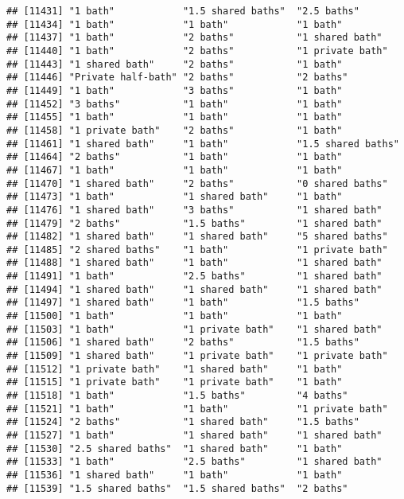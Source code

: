\documentclass[
]{article}
\begin{document}
\begin{verbatim}
## [11431] "1 bath"            "1.5 shared baths"  "2.5 baths"        
## [11434] "1 bath"            "1 bath"            "1 bath"           
## [11437] "1 bath"            "2 baths"           "1 shared bath"    
## [11440] "1 bath"            "2 baths"           "1 private bath"   
## [11443] "1 shared bath"     "2 baths"           "1 bath"           
## [11446] "Private half-bath" "2 baths"           "2 baths"          
## [11449] "1 bath"            "3 baths"           "1 bath"           
## [11452] "3 baths"           "1 bath"            "1 bath"           
## [11455] "1 bath"            "1 bath"            "1 bath"           
## [11458] "1 private bath"    "2 baths"           "1 bath"           
## [11461] "1 shared bath"     "1 bath"            "1.5 shared baths" 
## [11464] "2 baths"           "1 bath"            "1 bath"           
## [11467] "1 bath"            "1 bath"            "1 bath"           
## [11470] "1 shared bath"     "2 baths"           "0 shared baths"   
## [11473] "1 bath"            "1 shared bath"     "1 bath"           
## [11476] "1 shared bath"     "3 baths"           "1 shared bath"    
## [11479] "2 baths"           "1.5 baths"         "1 shared bath"    
## [11482] "1 shared bath"     "1 shared bath"     "5 shared baths"   
## [11485] "2 shared baths"    "1 bath"            "1 private bath"   
## [11488] "1 shared bath"     "1 bath"            "1 shared bath"    
## [11491] "1 bath"            "2.5 baths"         "1 shared bath"    
## [11494] "1 shared bath"     "1 shared bath"     "1 shared bath"    
## [11497] "1 shared bath"     "1 bath"            "1.5 baths"        
## [11500] "1 bath"            "1 bath"            "1 bath"           
## [11503] "1 bath"            "1 private bath"    "1 shared bath"    
## [11506] "1 shared bath"     "2 baths"           "1.5 baths"        
## [11509] "1 shared bath"     "1 private bath"    "1 private bath"   
## [11512] "1 private bath"    "1 shared bath"     "1 bath"           
## [11515] "1 private bath"    "1 private bath"    "1 bath"           
## [11518] "1 bath"            "1.5 baths"         "4 baths"          
## [11521] "1 bath"            "1 bath"            "1 private bath"   
## [11524] "2 baths"           "1 shared bath"     "1.5 baths"        
## [11527] "1 bath"            "1 shared bath"     "1 shared bath"    
## [11530] "2.5 shared baths"  "1 shared bath"     "1 bath"           
## [11533] "1 bath"            "2.5 baths"         "1 shared bath"    
## [11536] "1 shared bath"     "1 bath"            "1 bath"           
## [11539] "1.5 shared baths"  "1.5 shared baths"  "2 baths"          

\end{verbatim}
\end{document}
